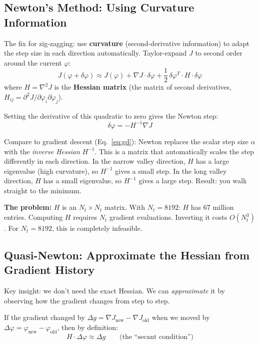 \documentclass[12pt,a4paper]{article}
\begin{document}
\subsection{Newton's Method: Using Curvature Information}

The fix for zig-zagging: use \textbf{curvature} (second-derivative information) to adapt the step size in each direction automatically. Taylor-expand $J$ to second order around the current $\varphi$:
\begin{equation}
J(\varphi + \delta\varphi) \approx J(\varphi) + \nabla J \cdot \delta\varphi + \frac{1}{2}\,\delta\varphi^T\!\cdot H\cdot\delta\varphi
\end{equation}
where $H = \nabla^2 J$ is the \textbf{Hessian matrix} (the matrix of second derivatives, $H_{ij} = \partial^2 J / \partial\varphi_i\partial\varphi_j$).

Setting the derivative of this quadratic to zero gives the Newton step:
\begin{equation}
\delta\varphi = -H^{-1}\nabla J
\label{eq:newton}
\end{equation}

\begin{intuition}
Compare to gradient descent (Eq.~\ref{eq:gd}): Newton replaces the scalar step size $\alpha$ with the \emph{inverse Hessian} $H^{-1}$. This is a matrix that automatically scales the step differently in each direction. In the narrow valley direction, $H$ has a large eigenvalue (high curvature), so $H^{-1}$ gives a small step. In the long valley direction, $H$ has a small eigenvalue, so $H^{-1}$ gives a large step. Result: you walk straight to the minimum.
\end{intuition}

\textbf{The problem:} $H$ is an $N_t \times N_t$ matrix. With $N_t = 8192$: $H$ has $67$ million entries. Computing $H$ requires $N_t$ gradient evaluations. Inverting it costs $O(N_t^3)$. For $N_t = 8192$, this is completely infeasible.

\subsection{Quasi-Newton: Approximate the Hessian from Gradient History}

Key insight: we don't need the exact Hessian. We can \emph{approximate} it by observing how the gradient changes from step to step.

If the gradient changed by $\Delta g = \nabla J_{\text{new}} - \nabla J_{\text{old}}$ when we moved by $\Delta\varphi = \varphi_{\text{new}} - \varphi_{\text{old}}$, then by definition:
\begin{equation}
H\cdot\Delta\varphi \approx \Delta g \qquad\text{(the ``secant condition'')}
\end{equation}
\end{document}
